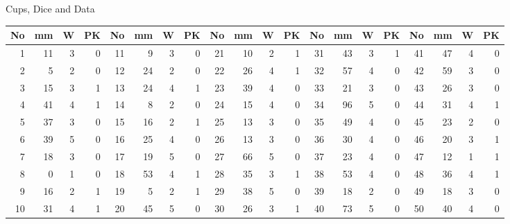 \begin{uebungsblatt}{Cups, Dice and Data}
\begin{center}
\footnotesize
\setlength{\tabcolsep}{3.2pt}
\begin{tabular}{@{}rrrr@{\hspace{9pt}}rrrr@{\hspace{9pt}}rrrr@{\hspace{9pt}}rrrr@{\hspace{9pt}}rrrr@{}}
\toprule
\textbf{No} & \textbf{mm} & \textbf{W} & \textbf{PK} &
\textbf{No} & \textbf{mm} & \textbf{W} & \textbf{PK} &
\textbf{No} & \textbf{mm} & \textbf{W} & \textbf{PK} &
\textbf{No} & \textbf{mm} & \textbf{W} & \textbf{PK} &
\textbf{No} & \textbf{mm} & \textbf{W} & \textbf{PK} \\
\midrule
 1 & 11 & 3 & 0 & 11 &  9 & 3 & 0 & 21 & 10 & 2 & 1 & 31 & 43 & 3 & 1 & 41 & 47 & 4 & 0 \\
 2 &  5 & 2 & 0 & 12 & 24 & 2 & 0 & 22 & 26 & 4 & 1 & 32 & 57 & 4 & 0 & 42 & 59 & 3 & 0 \\
 3 & 15 & 3 & 1 & 13 & 24 & 4 & 1 & 23 & 39 & 4 & 0 & 33 & 21 & 3 & 0 & 43 & 26 & 3 & 0 \\
 4 & 41 & 4 & 1 & 14 &  8 & 2 & 0 & 24 & 15 & 4 & 0 & 34 & 96 & 5 & 0 & 44 & 31 & 4 & 1 \\
 5 & 37 & 3 & 0 & 15 & 16 & 2 & 1 & 25 & 13 & 3 & 0 & 35 & 49 & 4 & 0 & 45 & 23 & 2 & 0 \\
 6 & 39 & 5 & 0 & 16 & 25 & 4 & 0 & 26 & 13 & 3 & 0 & 36 & 30 & 4 & 0 & 46 & 20 & 3 & 1 \\
 7 & 18 & 3 & 0 & 17 & 19 & 5 & 0 & 27 & 66 & 5 & 0 & 37 & 23 & 4 & 0 & 47 & 12 & 1 & 1 \\
 8 &  0 & 1 & 0 & 18 & 53 & 4 & 1 & 28 & 35 & 3 & 1 & 38 & 53 & 4 & 0 & 48 & 36 & 4 & 1 \\
 9 & 16 & 2 & 1 & 19 &  5 & 2 & 1 & 29 & 38 & 5 & 0 & 39 & 18 & 2 & 0 & 49 & 18 & 3 & 0 \\
10 & 31 & 4 & 1 & 20 & 45 & 5 & 0 & 30 & 26 & 3 & 1 & 40 & 73 & 5 & 0 & 50 & 40 & 4 & 0 \\
\bottomrule
\end{tabular}
\end{center}


\end{uebungsblatt}
